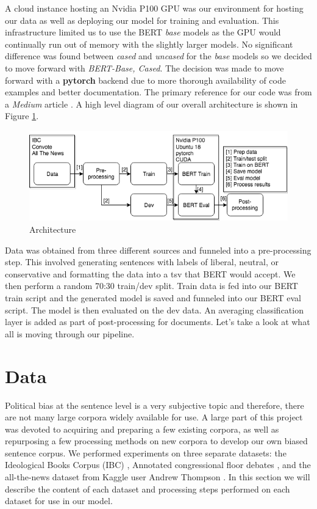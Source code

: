 \documentclass[10pt,a4paper,onecolumn]{article}
\begin{document}
A cloud instance hosting an Nvidia P100 GPU was our environment for hosting our data as well as deploying our model for training and evaluation. This infrastructure limited us to use the BERT \textit{base} models as the GPU would continually run out of memory with the slightly larger models. No significant difference was found between \textit{cased} and \textit{uncased} for the \textit{base} models so we decided to move forward with \textit{BERT-Base, Cased}. The decision was made to move forward with a \textbf{pytorch} backend due to more thorough availability of code examples and better documentation. The primary reference for our code was from a \textit{Medium} article \cite{usingbert}. A high level diagram of our overall architecture is shown in Figure \ref{fig:architecture}.
\begin{figure}[h]
	\begin{center}
		\includegraphics[width=0.8\linewidth]{architecture.png}
		\caption{Architecture}
		\label{fig:architecture}
	\end{center}
\end{figure}
Data was obtained from three different sources and funneled into a pre-processing step. This involved generating sentences with labels of liberal, neutral, or conservative and formatting the data into a tsv that BERT would accept. We then perform a random 70:30 train/dev split. Train data is fed into our BERT train script and the generated model is saved and funneled into our BERT eval script. The model is then evaluated on the dev data. An averaging classification layer is added as part of post-processing for documents. Let's take a look at what all is moving through our pipeline. 

\section{Data}
\label{sec:data}
Political bias at the sentence level is a very subjective topic and therefore, there are not many large corpora widely available for use. A large part of this project was devoted to acquiring and preparing a few existing corpora, as well as repurposing a few processing methods on new corpora to develop our own biased sentence corpus. We performed experiments on three separate datasets: the Ideological Books Corpus (IBC) \cite{iyyerRNN}, Annotated congressional floor debates \cite{convote}, and the all-the-news dataset from Kaggle user Andrew Thompson \cite{news}. In this section we will describe the content of each dataset and processing steps performed on each dataset for use in our model.
\end{document}
